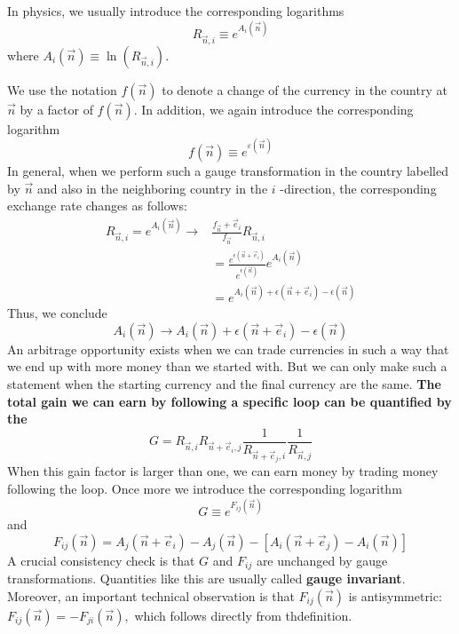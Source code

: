 In physics, we usually introduce the corresponding logarithms
$$
R_{\vec{n}, i} \equiv e^{A_{i}(\vec{n})}
$$
where $A_{i}(\vec{n}) \equiv \ln \left(R_{\vec{n}, i}\right)$.

We use the notation $f(\vec{n})$ to denote a change of the currency in the country at $\vec{n}$ by a factor of $f(\vec{n}) .$ In addition, we again introduce the corresponding logarithm
$$
f(\vec{n}) \equiv e^{\varepsilon(\vec{n})}
$$
In general, when we perform such a gauge transformation in the country labelled by $\vec{n}$ and also in the neighboring country in the $i$ -direction, the corresponding exchange rate changes as follows:
$$
\begin{aligned}
R_{\vec{n}, i}=e^{A_{i}(\vec{n})} \rightarrow & \frac{f_{\vec{n}}+\vec{e}_{i}}{f_{\vec{n}}} R_{\vec{n}, i} \\
&=\frac{e^{\epsilon\left(\vec{n}+\vec{e}_{i}\right)}}{e^{\epsilon(\vec{n})}} e^{A_{i}(\vec{n})} \\
&=e^{A_{i}(\vec{n})+\epsilon\left(\vec{n}+\vec{e}_{i}\right)-\epsilon(\vec{n})}
\end{aligned}
$$
Thus, we conclude
$$
A_{i}(\vec{n}) \rightarrow A_{i}(\vec{n})+\epsilon\left(\vec{n}+\vec{e}_{i}\right)-\epsilon(\vec{n})
$$
An arbitrage opportunity exists when we can trade currencies in such a way that we end up with more money than we started with. But we can only make such a statement when the starting currency and the final currency are the same. \textbf{The total gain we can earn by following a specific loop can be quantified by the }
$$
G=R_{\vec{n}, i} R_{\vec{n}+\vec{e}_{i}, j} \frac{1}{R_{\vec{n}+\vec{e}_{j}, i}} \frac{1}{R_{\vec{n}, j}}
$$
When this gain factor is larger than one, we can earn money by trading money following the loop. Once more we introduce the corresponding logarithm
$$
G \equiv e^{F_{i j}(\vec{n})}
$$
and
$$
F_{i j}(\vec{n})=A_{j}\left(\vec{n}+\vec{e}_{i}\right)-A_{j}(\vec{n})-\left[A_{i}\left(\vec{n}+\vec{e}_{j}\right)-A_{i}(\vec{n})\right]
$$
A crucial consistency check is that $G$ and $F_{i j}$ are unchanged by gauge transformations. Quantities like this are usually called \textbf{gauge invariant}. Moreover, an important technical observation is that $F_{i j}(\vec{n})$ is antisymmetric: $F_{i j}(\vec{n})=-F_{j i}(\vec{n}),$ which follows directly from thdefinition.

